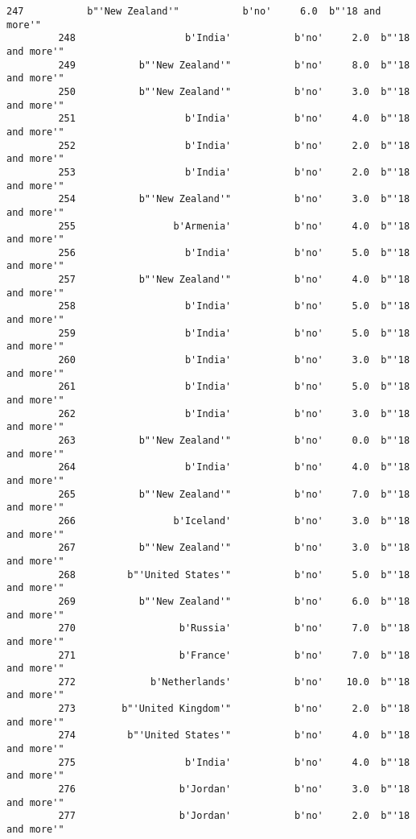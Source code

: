 \documentclass[11pt]{article}
\begin{document}
\begin{Verbatim}[commandchars=\\\{\}]
         247           b"'New Zealand'"           b'no'     6.0  b"'18 and more'"   
         248                   b'India'           b'no'     2.0  b"'18 and more'"   
         249           b"'New Zealand'"           b'no'     8.0  b"'18 and more'"   
         250           b"'New Zealand'"           b'no'     3.0  b"'18 and more'"   
         251                   b'India'           b'no'     4.0  b"'18 and more'"   
         252                   b'India'           b'no'     2.0  b"'18 and more'"   
         253                   b'India'           b'no'     2.0  b"'18 and more'"   
         254           b"'New Zealand'"           b'no'     3.0  b"'18 and more'"   
         255                 b'Armenia'           b'no'     4.0  b"'18 and more'"   
         256                   b'India'           b'no'     5.0  b"'18 and more'"   
         257           b"'New Zealand'"           b'no'     4.0  b"'18 and more'"   
         258                   b'India'           b'no'     5.0  b"'18 and more'"   
         259                   b'India'           b'no'     5.0  b"'18 and more'"   
         260                   b'India'           b'no'     3.0  b"'18 and more'"   
         261                   b'India'           b'no'     5.0  b"'18 and more'"   
         262                   b'India'           b'no'     3.0  b"'18 and more'"   
         263           b"'New Zealand'"           b'no'     0.0  b"'18 and more'"   
         264                   b'India'           b'no'     4.0  b"'18 and more'"   
         265           b"'New Zealand'"           b'no'     7.0  b"'18 and more'"   
         266                 b'Iceland'           b'no'     3.0  b"'18 and more'"   
         267           b"'New Zealand'"           b'no'     3.0  b"'18 and more'"   
         268         b"'United States'"           b'no'     5.0  b"'18 and more'"   
         269           b"'New Zealand'"           b'no'     6.0  b"'18 and more'"   
         270                  b'Russia'           b'no'     7.0  b"'18 and more'"   
         271                  b'France'           b'no'     7.0  b"'18 and more'"   
         272             b'Netherlands'           b'no'    10.0  b"'18 and more'"   
         273        b"'United Kingdom'"           b'no'     2.0  b"'18 and more'"   
         274         b"'United States'"           b'no'     4.0  b"'18 and more'"   
         275                   b'India'           b'no'     4.0  b"'18 and more'"   
         276                  b'Jordan'           b'no'     3.0  b"'18 and more'"   
         277                  b'Jordan'           b'no'     2.0  b"'18 and more'"   

\end{Verbatim}
\end{document}
